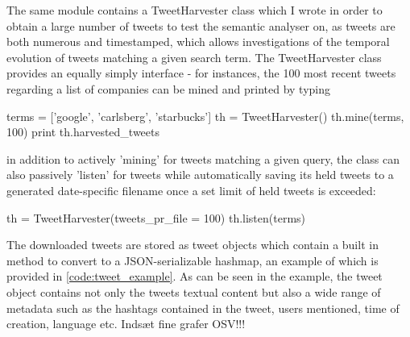 The same module contains a TweetHarvester class which I wrote in order to obtain a large number of tweets to test the semantic analyser on, as tweets are both numerous and timestamped, which allows investigations of the temporal evolution of tweets matching a given search term. The TweetHarvester class provides an equally simply interface - for instances, the 100 most recent tweets regarding a list of companies can be mined and printed by typing
\begin{snippet}[language=python]
	terms = ['google', 'carlsberg', 'starbucks']
	th = TweetHarvester()
	th.mine(terms, 100)
	print th.harvested_tweets
\end{snippet}
in addition to actively 'mining' for tweets matching a given query, the class can also passively 'listen' for tweets while automatically saving its held tweets to a generated date-specific filename once a set limit of held tweets is exceeded:
\begin{snippet}[language=python]
	th = TweetHarvester(tweets_pr_file = 100)
	th.listen(terms)
\end{snippet}
The downloaded tweets are stored as tweet objects which contain a built in method to convert to a JSON-serializable hashmap, an example of which is provided in \ref{code:tweet_example}.
%
%
As can be seen in the example, the tweet object contains not only the tweets textual content but also a wide range of metadata such as the hashtags contained in the tweet, users mentioned, time of creation, language etc.
Indsæt fine grafer OSV!!! 


